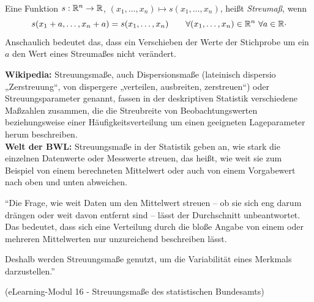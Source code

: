 \begin{defi}
     \\
    Eine Funktion $s:\mathbb{R}^n\to\mathbb{R}$, $(x_1,\dots,x_n)\mapsto s(x_1,\dots,x_n)$, heißt \emph{\gls{Streumaß}}, wenn
    \[
        s(x_1+a,\dots,x_n+a) = s(x_1,\dots,x_n) \qquad \forall (x_1,\dots,x_n)\in\mathbb{R}^n \ \forall a\in\mathbb{R} \cdot
    \]
    Anschaulich bedeutet das, dass ein Verschieben der Werte der Stichprobe um ein $a$ den Wert eines \gls{Streumaß}es nicht verändert.
\end{defi}

\begin{kom}
    \textbf{Wikipedia:} Streuungsmaße, auch Dispersionsmaße (lateinisch dispersio „Zerstreuung“, von dispergere
    „verteilen, ausbreiten, zerstreuen“) oder Streuungsparameter genannt, fassen in der deskriptiven Statistik
    verschiedene Maßzahlen zusammen, die die Streubreite von Beobachtungswerten beziehungsweise einer
    Häufigkeitsverteilung um einen geeigneten Lageparameter herum beschreiben. \\


    \textbf{Welt der BWL:} Streuungsmaße in der Statistik geben an, wie stark die einzelnen Datenwerte oder
    Messwerte streuen,
    das heißt, wie weit sie zum Beispiel von einem berechneten Mittelwert oder auch von einem Vorgabewert nach oben und unten abweichen.
\end{kom}

\begin{kom}
    ``Die Frage, wie weit Daten um den Mittelwert streuen – ob sie sich eng darum drängen oder weit davon entfernt
    sind – lässt der Durchschnitt unbeantwortet. Das bedeutet, dass sich eine Verteilung durch die bloße Angabe von
    einem oder mehreren Mittelwerten nur unzureichend beschreiben lässt.

    Deshalb werden Streuungsmaße genutzt, um die Variabilität eines Merkmals darzustellen.''

    (eLearning-Modul 16 - Streuungsmaße des statistischen Bundesamts)
\end{kom}


